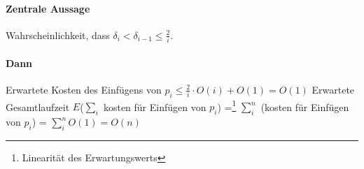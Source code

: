 \paragraph*{Zentrale Aussage} Wahrscheinlichkeit, dass $\delta_i < \delta_{i-1} \leq \frac{2}{i}$.

\paragraph*{Dann} Erwartete Kosten des Einfügens von $p_i \leq \frac{2}{i} \cdot O(i) + O(1) = O(1)$
Erwartete Gesamtlaufzeit $E$($\sum\limits_i$ kosten für Einfügen von $p_i$) =\footnote{Linearität des Erwartungswerts} $\sum\limits_i^n$ (kosten für Einfügen von $p_i$) = $\sum\limits_i^n O(1) = O(n)$






